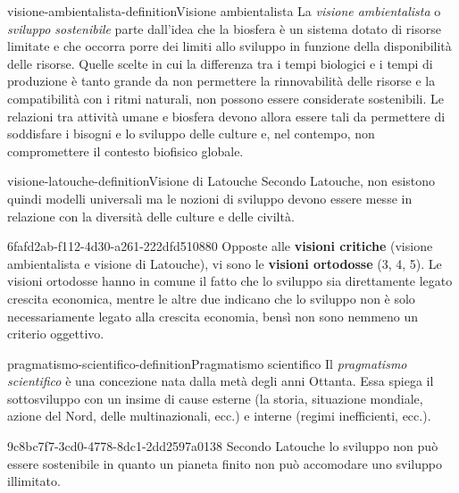 \documentclass[preview]{standalone}
\begin{document}
\begin{snippetdefinition}{visione-ambientalista-definition}{Visione ambientalista}
    La \textit{visione ambientalista} o \textit{sviluppo sostenibile}
    parte dall'idea che la biosfera è un sistema
    dotato di risorse limitate e che occorra porre dei limiti allo sviluppo in
    funzione della disponibilità delle risorse. Quelle scelte in cui la differenza tra
    i tempi biologici e i tempi di produzione è tanto grande da non permettere
    la rinnovabilità delle risorse e la compatibilità con i ritmi naturali, non
    possono essere considerate sostenibili. Le relazioni tra attività umane e
    biosfera devono allora essere tali da permettere di soddisfare i bisogni e lo
    sviluppo delle culture e, nel contempo, non compromettere il contesto
    biofisico globale.
\end{snippetdefinition}

\begin{snippetdefinition}{visione-latouche-definition}{Visione di Latouche}
    Secondo Latouche, non esistono quindi modelli universali
    ma le nozioni di sviluppo devono essere messe in relazione con la diversità
    delle culture e delle civiltà.
\end{snippetdefinition}

\begin{snippet}{6fafd2ab-f112-4d30-a261-222dfd510880}
    Opposte alle \textbf{visioni critiche} (visione ambientalista e visione di Latouche),
    vi sono le \textbf{visioni ortodosse} (3, 4, 5).
    Le visioni ortodosse hanno in comune il fatto che lo sviluppo sia direttamente legato crescita economica,
    mentre le altre due indicano che lo sviluppo non è solo necessariamente legato alla crescita economia,
    bensì non sono nemmeno un criterio oggettivo.
\end{snippet}

\begin{snippetdefinition}{pragmatismo-scientifico-definition}{Pragmatismo scientifico}
    Il \textit{pragmatismo scientifico} è una concezione nata dalla metà degli anni Ottanta.
    Essa spiega il sottosviluppo con un insime di cause esterne (la storia, situazione mondiale, azione del Nord, delle multinazionali, ecc.)
    e interne (regimi inefficienti, ecc.).
\end{snippetdefinition}


\begin{snippet}{9c8bc7f7-3cd0-4778-8dc1-2dd2597a0138}
    Secondo Latouche lo sviluppo non può essere sostenibile in quanto
    un pianeta finito non può accomodare uno sviluppo illimitato.
\end{snippet}
\end{document}
